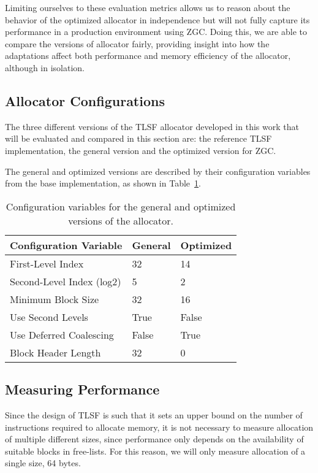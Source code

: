 Limiting ourselves to these evaluation metrics allows us to reason about the behavior of the optimized allocator in independence but will not fully capture its performance in a production environment using ZGC. Doing this, we are able to compare the versions of allocator fairly, providing insight into how the adaptations affect both performance and memory efficiency of the allocator, although in isolation.

\subsection{Allocator Configurations}

The three different versions of the TLSF allocator developed in this work that will be evaluated and compared in this section are: the reference TLSF implementation, the general version and the optimized version for ZGC. 

The general and optimized versions are described by their configuration variables from the base implementation, as shown in Table~\ref{table:configuration-variables}.

\begin{table}[H]
\centering
\begin{tabular}{lllll}
\hline
Configuration Variable    & General  & \multicolumn{3}{l}{Optimized} \\ \hline
First-Level Index         & 32       & \multicolumn{3}{l}{14}        \\
Second-Level Index (log2) & 5        & \multicolumn{3}{l}{2}         \\
Minimum Block Size        & 32       & \multicolumn{3}{l}{16 }       \\
Use Second Levels         & True     & \multicolumn{3}{l}{False}     \\
Use Deferred Coalescing   & False    & \multicolumn{3}{l}{True}      \\
Block Header Length       & 32       & \multicolumn{3}{l}{0}        
\end{tabular}
\caption{Configuration variables for the general and optimized versions of the allocator.}
\label{table:configuration-variables}
\end{table}

\subsection{Measuring Performance}

Since the design of TLSF is such that it sets an upper bound on the number of instructions required to allocate memory, it is not necessary to measure allocation of multiple different sizes, since performance only depends on the availability of suitable blocks in free-lists. For this reason, we will only measure allocation of a single size, 64 bytes. 

